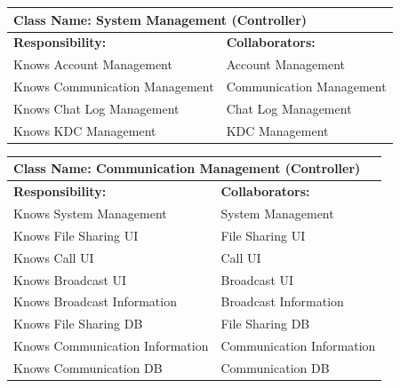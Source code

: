 \documentclass[]{article}
\begin{document}
\begin{table}[ht]
	\centering
	\begin{tabular}{|p{7cm}|p{7cm}|}
		\hline
		\multicolumn{2}{|l|}{\textbf{Class Name:} System Management (Controller)} \\
		\hline
		\textbf{Responsibility:}       & \textbf{Collaborators:}                  \\
		\hline
		Knows Account Management       & Account Management                       \\
		Knows Communication Management & Communication Management                 \\
		Knows Chat Log Management      & Chat Log Management                      \\
		Knows KDC Management           & KDC Management                           \\
		\hline
	\end{tabular}
\end{table}

\begin{table}[ht]
	\centering
	\begin{tabular}{|p{7cm}|p{7cm}|}
		\hline
		\multicolumn{2}{|l|}{\textbf{Class Name:} Communication Management (Controller)} \\
		\hline
		\textbf{Responsibility:}        & \textbf{Collaborators:}                        \\
		\hline
		Knows System Management         & System Management                              \\
		Knows File Sharing UI           & File Sharing UI                                \\
		Knows Call UI                   & Call UI                                        \\
		Knows Broadcast UI              & Broadcast UI                                   \\
		Knows Broadcast Information     & Broadcast Information                          \\
		Knows File Sharing DB           & File Sharing DB                                \\
		Knows Communication Information & Communication Information                      \\
		Knows Communication DB          & Communication DB                               \\
		\hline
	\end{tabular}
\end{table}
\end{document}
